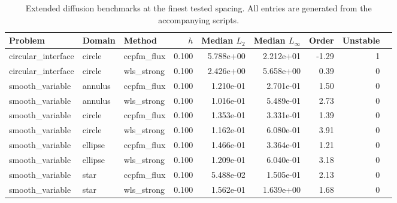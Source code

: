 \begin{table}[t]
\centering
\caption{Extended diffusion benchmarks at the finest tested spacing. All entries are generated from the accompanying scripts.}
\label{tab:extended_diffusion}
\begin{tabular}{lllrrrrrr}
\toprule
Problem & Domain & Method & $h$ & Median $L_2$ & Median $L_\infty$ & Order & Unstable \\
\midrule
circular\_interface & circle & ccpfm\_flux & 0.100 & 5.788e+00 & 2.212e+01 & -1.29 & 1 \\
circular\_interface & circle & wls\_strong & 0.100 & 2.426e+00 & 5.658e+00 & 0.39 & 0 \\
smooth\_variable & annulus & ccpfm\_flux & 0.100 & 1.210e-01 & 2.701e-01 & 1.50 & 0 \\
smooth\_variable & annulus & wls\_strong & 0.100 & 1.016e-01 & 5.489e-01 & 2.73 & 0 \\
smooth\_variable & circle & ccpfm\_flux & 0.100 & 1.353e-01 & 3.331e-01 & 1.39 & 0 \\
smooth\_variable & circle & wls\_strong & 0.100 & 1.162e-01 & 6.080e-01 & 3.91 & 0 \\
smooth\_variable & ellipse & ccpfm\_flux & 0.100 & 1.466e-01 & 3.364e-01 & 1.21 & 0 \\
smooth\_variable & ellipse & wls\_strong & 0.100 & 1.209e-01 & 6.040e-01 & 3.18 & 0 \\
smooth\_variable & star & ccpfm\_flux & 0.100 & 5.488e-02 & 1.505e-01 & 2.13 & 0 \\
smooth\_variable & star & wls\_strong & 0.100 & 1.562e-01 & 1.639e+00 & 1.68 & 0 \\
\bottomrule
\end{tabular}
\end{table}
